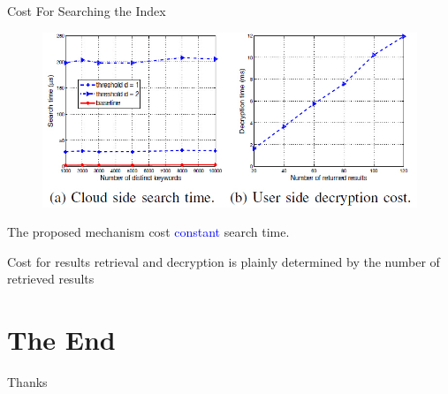 \documentclass{beamer}
\begin{document}
\begin{frame}{Cost For Searching the Index}
	\begin{figure}
		\includegraphics[width=.75\textwidth]{subfig4.jpg}
	\end{figure}
	\begin{block}{}
		The proposed  mechanism cost \textcolor{blue}{constant} search time.
	\end{block}
	\begin{exampleblock}{}
		Cost for results retrieval and decryption is plainly determined by the \textcolor[rgb]{0.1,0.7,0.2}{number} of retrieved results
	\end{exampleblock}
\end{frame}


\section{The End}
\begin{frame}
\Huge{\centerline{Thanks}}
\end{frame}

\end{document}
